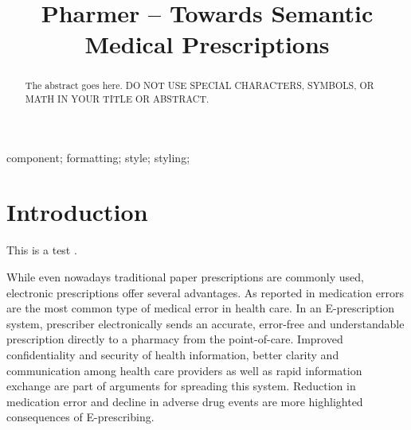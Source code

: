 \documentclass[10pt, conference, compsocconf]{IEEEtran}
\begin{document}
\title{Pharmer -- Towards Semantic Medical Prescriptions}



\author{
\and
{}
}


\maketitle

\begin{abstract}
The abstract goes here. DO NOT USE SPECIAL CHARACTERS, SYMBOLS, OR MATH IN YOUR TITLE OR ABSTRACT.

\end{abstract}

\begin{IEEEkeywords}
component; formatting; style; styling;

\end{IEEEkeywords}


\IEEEpeerreviewmaketitle



\section{Introduction}
\label{intro}
This is a test \cite{Khalili2012}.

While even nowadays traditional paper prescriptions are commonly used, electronic prescriptions offer several advantages.
As reported in \cite{} medication errors are the most common type of medical error in health care.
In an E-prescription system, prescriber electronically sends an accurate, error-free and understandable prescription directly to a pharmacy from the point-of-care.
Improved confidentiality and security of health information, better clarity and communication among health care providers as well as rapid information exchange are part of arguments for spreading this system.
Reduction in medication error and decline in adverse drug events are more highlighted consequences of E-prescribing.
\end{document}
